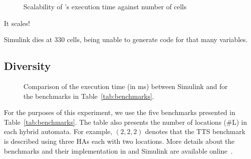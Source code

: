\begin{figure}[htbp]
	\centering
	
	\caption{Scalability of \ourTool's execution time against number of cells}
	\label{fig:scalability}
\end{figure}

It scales!

Simulink dies at 330 cells, being unable to generate code for that many variables.

\subsection{Diversity}

\begin{figure}[htbp]
	\centering
	
	\caption{Comparison of the execution time (in ms) between Simulink\textsuperscript{\textregistered} and \ourTool for the benchmarks in Table~\ref{tab:benchmarks}.}
	\label{fig:executionTime}
\end{figure}

For the purposes of this experiment, we use the five benchmarks presented in Table~\ref{tab:benchmarks}.
The table also presents the number of locations (\#L) in each hybrid automata.
For example, $(2, 2, 2)$ denotes that the \acf{TTS} benchmark is described using three \acp{HA} each with two locations.
More details about the benchmarks and their implementation in \ourTool and Simulink\textsuperscript{\textregistered} are available online~\cite{githubBenchmarks}.

